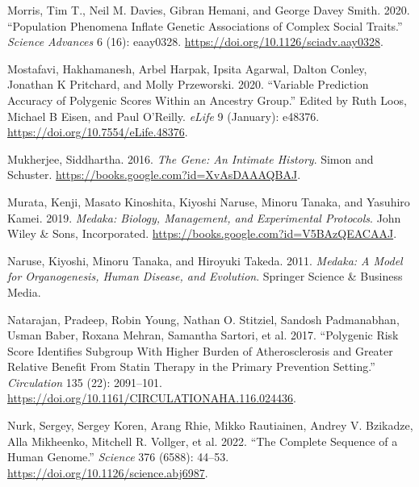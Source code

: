 \documentclass[
]{book}
\newlength{\cslhangindent}
\newlength{\cslentryspacingunit} %
\newenvironment{CSLReferences}[2] %
 {%
  \setlength{\parindent}{0pt}
  \ifodd #1
  \let\oldpar\par
  \def\par{\hangindent=\cslhangindent\oldpar}
  \fi
  \setlength{\parskip}{#2\cslentryspacingunit}
 }%
 {}
\begin{document}
\begin{CSLReferences}{1}{0}
\leavevmode{}%
Morris, Tim T., Neil M. Davies, Gibran Hemani, and George Davey Smith. 2020. {``Population Phenomena Inflate Genetic Associations of Complex Social Traits.''} \emph{Science Advances} 6 (16): eaay0328. \url{https://doi.org/10.1126/sciadv.aay0328}.

\leavevmode{}%
Mostafavi, Hakhamanesh, Arbel Harpak, Ipsita Agarwal, Dalton Conley, Jonathan K Pritchard, and Molly Przeworski. 2020. {``Variable Prediction Accuracy of Polygenic Scores Within an Ancestry Group.''} Edited by Ruth Loos, Michael B Eisen, and Paul O'Reilly. \emph{eLife} 9 (January): e48376. \url{https://doi.org/10.7554/eLife.48376}.

\leavevmode{}%
Mukherjee, Siddhartha. 2016. \emph{The {Gene}: {An Intimate History}}. {Simon and Schuster}. \url{https://books.google.com?id=XvAsDAAAQBAJ}.

\leavevmode{}%
Murata, Kenji, Masato Kinoshita, Kiyoshi Naruse, Minoru Tanaka, and Yasuhiro Kamei. 2019. \emph{Medaka: {Biology}, {Management}, and {Experimental Protocols}}. {John Wiley \& Sons, Incorporated}. \url{https://books.google.com?id=V5BAzQEACAAJ}.

\leavevmode{}%
Naruse, Kiyoshi, Minoru Tanaka, and Hiroyuki Takeda. 2011. \emph{Medaka: A Model for Organogenesis, Human Disease, and Evolution}. {Springer Science \& Business Media}.

\leavevmode{}%
Natarajan, Pradeep, Robin Young, Nathan O. Stitziel, Sandosh Padmanabhan, Usman Baber, Roxana Mehran, Samantha Sartori, et al. 2017. {``Polygenic {Risk Score Identifies Subgroup With Higher Burden} of {Atherosclerosis} and {Greater Relative Benefit From Statin Therapy} in the {Primary Prevention Setting}.''} \emph{Circulation} 135 (22): 2091--101. \url{https://doi.org/10.1161/CIRCULATIONAHA.116.024436}.

\leavevmode{}%
Nurk, Sergey, Sergey Koren, Arang Rhie, Mikko Rautiainen, Andrey V. Bzikadze, Alla Mikheenko, Mitchell R. Vollger, et al. 2022. {``The Complete Sequence of a Human Genome.''} \emph{Science} 376 (6588): 44--53. \url{https://doi.org/10.1126/science.abj6987}.


\end{CSLReferences}
\end{document}
